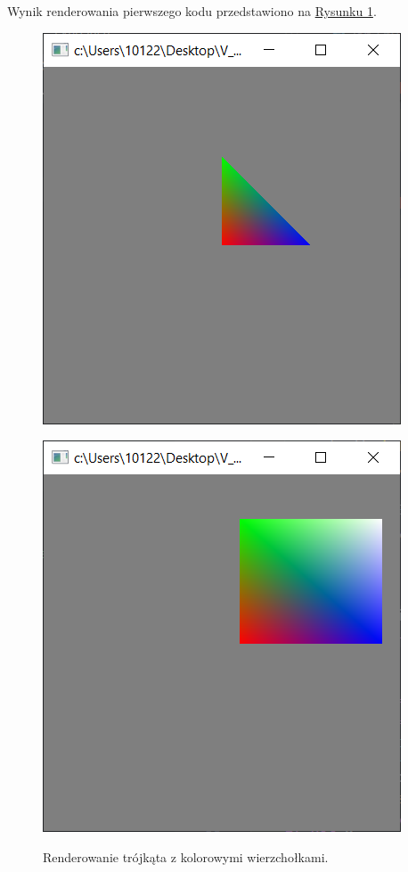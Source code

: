 \documentclass[a4paper, 12pt]{article}
\begin{document}
Wynik renderowania pierwszego kodu przedstawiono na \hyperref[fig:zad1]{Rysunku 1}.

\begin{figure}[h]
    \centering
    \begin{minipage}{0.45\textwidth}
        \centering
        \includegraphics[width=\textwidth]{zad1.png}
        \caption{Renderowanie trójkąta z kolorowymi wierzchołkami.} 
        \label{fig:zad1}
    \end{minipage}
    \hfill
    \begin{minipage}{0.45\textwidth}
        \centering
        \label{fig:zad2}
        \includegraphics[width=\textwidth]{zad2.png}

\end{minipage}
\end{figure}
\end{document}
